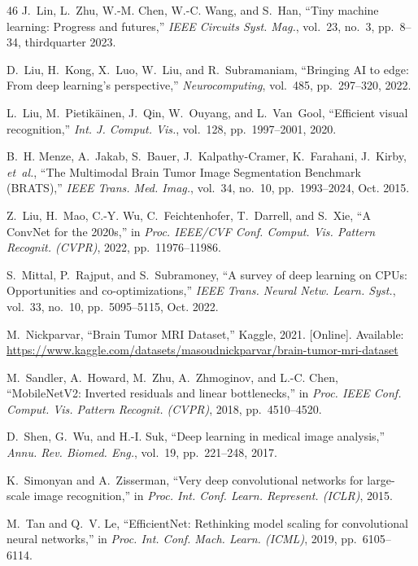 \begin{thebibliography}{46}
J.~Lin, L.~Zhu, W.-M. Chen, W.-C. Wang, and S.~Han, ``Tiny machine learning: Progress and futures,'' \emph{IEEE Circuits Syst. Mag.}, vol.~23, no.~3, pp.~8--34, thirdquarter 2023. 

D.~Liu, H.~Kong, X.~Luo, W.~Liu, and R.~Subramaniam, ``Bringing AI to edge: From deep learning's perspective,'' \emph{Neurocomputing}, vol.~485, pp.~297--320, 2022. 

L.~Liu, M.~Pietik{\"a}inen, J.~Qin, W.~Ouyang, and L.~Van~Gool, ``Efficient visual recognition,'' \emph{Int. J. Comput. Vis.}, vol.~128, pp.~1997--2001, 2020. 

B.~H. Menze, A.~Jakab, S.~Bauer, J.~Kalpathy-Cramer, K.~Farahani, J.~Kirby, \emph{et~al.}, ``The Multimodal Brain Tumor Image Segmentation Benchmark (BRATS),'' \emph{IEEE Trans. Med. Imag.}, vol.~34, no.~10, pp.~1993--2024, Oct. 2015. 

Z.~Liu, H.~Mao, C.-Y. Wu, C.~Feichtenhofer, T.~Darrell, and S.~Xie, ``A ConvNet for the 2020s,'' in \emph{Proc. IEEE/CVF Conf. Comput. Vis. Pattern Recognit. (CVPR)}, 2022, pp.~11976--11986.

S.~Mittal, P.~Rajput, and S.~Subramoney, ``A survey of deep learning on CPUs: Opportunities and co-optimizations,'' \emph{IEEE Trans. Neural Netw. Learn. Syst.}, vol.~33, no.~10, pp.~5095--5115, Oct. 2022. 

M.~Nickparvar, ``Brain Tumor MRI Dataset,'' Kaggle, 2021. [Online]. Available: \url{https://www.kaggle.com/datasets/masoudnickparvar/brain-tumor-mri-dataset}

M.~Sandler, A.~Howard, M.~Zhu, A.~Zhmoginov, and L.-C. Chen, ``MobileNetV2: Inverted residuals and linear bottlenecks,'' in \emph{Proc. IEEE Conf. Comput. Vis. Pattern Recognit. (CVPR)}, 2018, pp.~4510--4520.

D.~Shen, G.~Wu, and H.-I. Suk, ``Deep learning in medical image analysis,'' \emph{Annu. Rev. Biomed. Eng.}, vol.~19, pp.~221--248, 2017. 

K.~Simonyan and A.~Zisserman, ``Very deep convolutional networks for large-scale image recognition,'' in \emph{Proc. Int. Conf. Learn. Represent. (ICLR)}, 2015.

M.~Tan and Q.~V. Le, ``EfficientNet: Rethinking model scaling for convolutional neural networks,'' in \emph{Proc. Int. Conf. Mach. Learn. (ICML)}, 2019, pp.~6105--6114.


\end{thebibliography}
